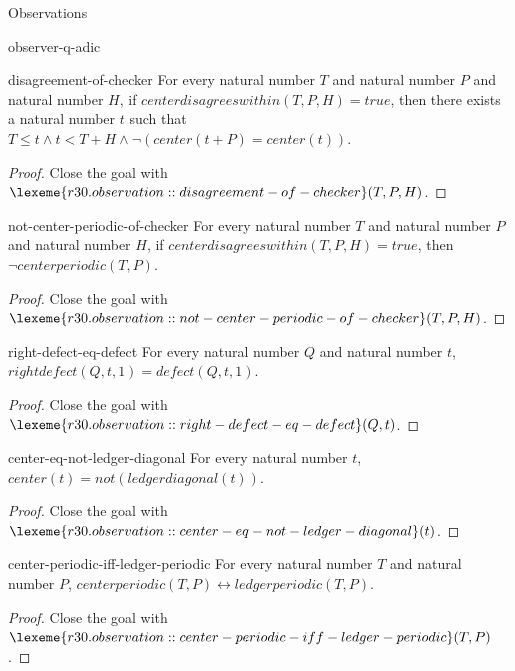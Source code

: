 \begin{lexlean}{Observations}
\begin{section}{observer-q-adic}
\begin{theorem}{disagreement-of-checker}
For every natural number \(T\) and natural number \(P\) and natural number \(H\), if \(centerdisagreeswithin(T, P, H) = true\), then there exists a natural number \(t\) such that \(T ≤ t ∧ t < T + H ∧ ¬ (center(t + P) = center(t))\).
\begin{proof}
Close the goal with \(\lexeme{r30.observation::disagreement-of-checker}(T, P, H)\).
\end{proof}
\end{theorem}

\begin{theorem}{not-center-periodic-of-checker}
For every natural number \(T\) and natural number \(P\) and natural number \(H\), if \(centerdisagreeswithin(T, P, H) = true\), then \(¬ centerperiodic(T, P)\).
\begin{proof}
Close the goal with \(\lexeme{r30.observation::not-center-periodic-of-checker}(T, P, H)\).
\end{proof}
\end{theorem}

\begin{theorem}{right-defect-eq-defect}
For every natural number \(Q\) and natural number \(t\), \(rightdefect(Q, t, 1) = defect(Q, t, 1)\).
\begin{proof}
Close the goal with \(\lexeme{r30.observation::right-defect-eq-defect}(Q, t)\).
\end{proof}
\end{theorem}

\begin{theorem}{center-eq-not-ledger-diagonal}
For every natural number \(t\), \(center(t) = not(ledgerdiagonal(t))\).
\begin{proof}
Close the goal with \(\lexeme{r30.observation::center-eq-not-ledger-diagonal}(t)\).
\end{proof}
\end{theorem}

\begin{theorem}{center-periodic-iff-ledger-periodic}
For every natural number \(T\) and natural number \(P\), \(centerperiodic(T, P) ↔ ledgerperiodic(T, P)\).
\begin{proof}
Close the goal with \(\lexeme{r30.observation::center-periodic-iff-ledger-periodic}(T, P)\).
\end{proof}
\end{theorem}


\end{section}
\end{lexlean}
